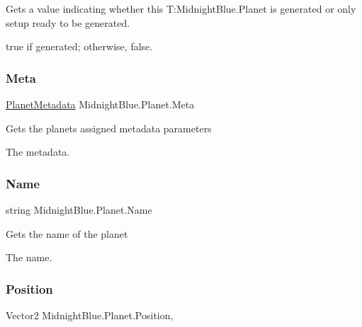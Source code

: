 Gets a value indicating whether this T\+:\+Midnight\+Blue.\+Planet is generated or only setup ready to be generated. 

{\ttfamily true} if generated; otherwise, {\ttfamily false}.\hypertarget{class_midnight_blue_1_1_planet_a064b1e2b9aa83abac4065f4a7e0c5e58}{}\label{class_midnight_blue_1_1_planet_a064b1e2b9aa83abac4065f4a7e0c5e58} 
\subsubsection{\texorpdfstring{Meta}{Meta}}
{\footnotesize\ttfamily \hyperlink{class_midnight_blue_1_1_planet_metadata}{Planet\+Metadata} Midnight\+Blue.\+Planet.\+Meta\hspace{0.3cm}{\ttfamily [get]}}



Gets the planets assigned metadata parameters 

The metadata.\hypertarget{class_midnight_blue_1_1_planet_aafbf18faf5aea56097d4f20d6b166d8a}{}\label{class_midnight_blue_1_1_planet_aafbf18faf5aea56097d4f20d6b166d8a} 
\subsubsection{\texorpdfstring{Name}{Name}}
{\footnotesize\ttfamily string Midnight\+Blue.\+Planet.\+Name\hspace{0.3cm}{\ttfamily [get]}}



Gets the name of the planet 

The name.\hypertarget{class_midnight_blue_1_1_planet_a1ca1fc407e47136abb5b633e11cb8d51}{}\label{class_midnight_blue_1_1_planet_a1ca1fc407e47136abb5b633e11cb8d51} 
\subsubsection{\texorpdfstring{Position}{Position}}
{\footnotesize\ttfamily Vector2 Midnight\+Blue.\+Planet.\+Position\hspace{0.3cm}{\ttfamily [get]}, {\ttfamily [set]}}



